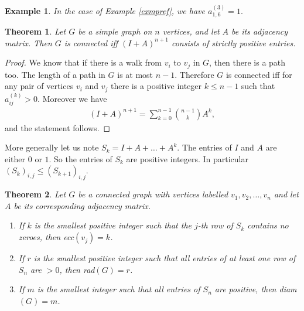 \documentclass[12pt,a4paper]{article}
\newtheorem{thm}{Theorem}[section]
\newtheorem{exmp}{Example}[section]
\theoremstyle{definition}
\begin{document}
\begin{exmp} In the case of Example \ref{exmpref}, we have $a_{1,6}^{(3)}=1.$
\end{exmp}
\begin{thm} Let $G$ be a simple graph on $n$ vertices, and let $A$ be its adjacency matrix. Then $G$ is connected iff $(I+A)^{n+1}$ consists of strictly positive entries.
\end{thm}
\begin{proof}
We know that if there is a walk from $v_i$ to $v_j$ in $G$, then there is a path too. The length of a path in $G$ is at most $n-1$. Therefore $G$ is connected iff for any pair of vertices $v_i$ and $v_j$ there is a positive integer $k \leq n-1$ such that $a_{ij}^{(k)} >0$. Moreover we have
\begin{align*}
(I+A)^{n+1} = \sum_{k=0}^{n-1} {n-1 \choose k } A^k,
\end{align*}
and the statement follows. 
\end{proof}
More generally let us note $S_k = I + A + \dots + A^k$. The entries of $I$ and $A$ are either $0$ or $1$. So the entries of $S_k$ are positive integers. In particular $(S_k)_{i,j} \leq ( S_{k+1})_{i,j}$.
\begin{thm} Let $G$ be a connected graph with vertices labelled $v_1,v_2, \dots , v_n$ and let $A$ be its corresponding adjacency matrix. 
\begin{enumerate}
\item If $k$ is the smallest positive integer such that the $j$-th row of $S_k$ contains no zeroes, then ecc$(v_j)=k$.
\item If $r$ is the smallest positive integer such that all entries of at least one row of $S_n$ are $>0$, then rad$(G)=r$. 
\item If $m$ is the smallest integer such that all entries of $S_n$ are positive, then diam$(G)=m$. 
\end{enumerate}
\end{thm}
\newpage
\end{document}
